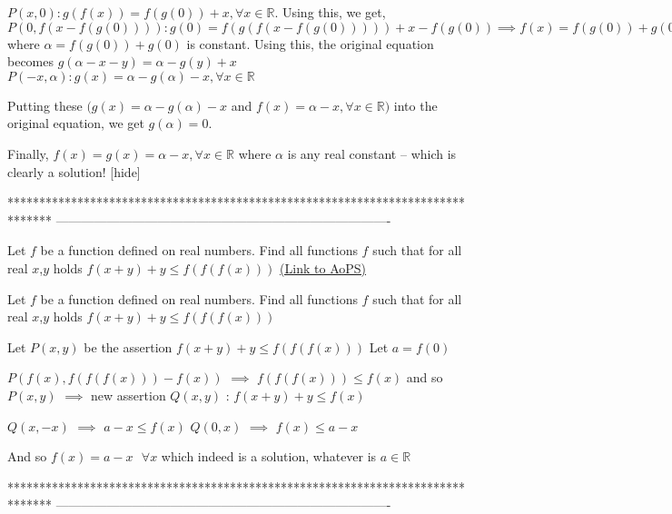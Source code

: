 \begin{solution}$P(x, 0) : g(f(x)) = f(g(0)) +x, \forall x \in \mathbb{R}$. Using this, we get,
$P(0, f(x-f(g(0)))) : g(0) = f(g(f(x-f(g(0)))))+x-f(g(0)) \implies f(x)=f(g(0))+g(0)-x. \therefore f(x) = \alpha -x, \forall x \in \mathbb{R}$ where $\alpha=f(g(0))+g(0)$ is constant.
Using this, the original equation becomes $g(\alpha-x-y)=\alpha -g(y)+x$
$P(-x, \alpha): g(x)=\alpha - g(\alpha) -x, \forall x \in \mathbb{R}$

Putting these $(g(x)=\alpha - g(\alpha) -x$ and $f(x) = \alpha -x, \forall x \in \mathbb{R})$ into the original equation, we get $g(\alpha)=0$.

Finally, $f(x)=g(x)=\alpha-x, \forall x \in \mathbb{R}$ where $\alpha$ is any real constant -- which is clearly a solution!   [\/hide]
\end{solution}
*******************************************************************************
-------------------------------------------------------------------------------

\begin{problem}
	Let $f$ be a function defined on real numbers. Find all functions $f$ such that for all real $x$,$y$ holds $f(x+y)+y\leq f(f(f(x)))$
	\flushright \href{https://artofproblemsolving.com/community/c6h586425}{(Link to AoPS)}
\end{problem}



\begin{solution}
	\begin{tcolorbox}Let $f$ be a function defined on real numbers. Find all functions $f$ such that for all real $x$,$y$ holds $f(x+y)+y\leq f(f(f(x)))$\end{tcolorbox}
Let $P(x,y)$ be the assertion $f(x+y)+y\le f(f(f(x)))$
Let $a=f(0)$

$P(f(x),f(f(f(x)))-f(x))$ $\implies$ $f(f(f(x)))\le f(x)$ and so $P(x,y)$ $\implies$ new assertion $Q(x,y)$ : $f(x+y)+y\le f(x)$

$Q(x,-x)$ $\implies$ $a-x\le f(x)$
$Q(0,x)$ $\implies$ $f(x)\le a-x$

And so $\boxed{f(x)=a-x\text{   }\forall x}$ which indeed is a solution, whatever is $a\in\mathbb R$
\end{solution}
*******************************************************************************
-------------------------------------------------------------------------------

